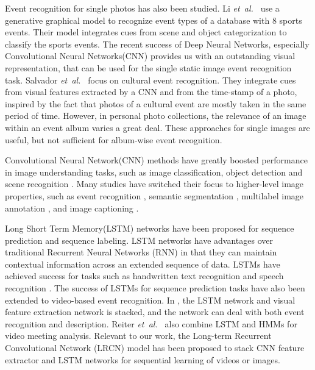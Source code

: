 \documentclass[runningheads]{llncs}
\newcommand{\etal}{\mbox{\emph{et al.\ }}}
\begin{document}
Event recognition for single photos has also been studied.  Li \etal \cite{what_where} use a generative graphical model to recognize event types of a database with 8 sports events. Their model integrates cues from scene and object categorization to classify the sports events. The recent success of Deep Neural Networks, especially  Convolutional Neural Networks(CNN) provides us with an outstanding visual representation, that can be used for the single static image event recognition task\cite{Park_2015_CVPR_Workshops, cSalvadora}. Salvador \etal\cite{cSalvadora} focus on cultural event recognition. They integrate cues from visual features extracted by a CNN and from the time-stamp of a photo, inspired by the fact that photos of a cultural event are mostly taken in the same period of time. However, in personal photo collections, the relevance of an image within an event album varies a great deal. These approaches for single images are useful, but not sufficient for album-wise event recognition.



Convolutional Neural Network(CNN) methods have greatly boosted performance in image understanding tasks, such as image classification, object detection and scene recognition \cite{imagenet, googlenet, rcnn, places}. Many studies have switched their focus to higher-level image properties, such as event recognition \cite{event_recognition}, semantic segmentation \cite{long_shelhamer_fcn},  multilabel image annotation \cite{tagging}, and image captioning \cite{lrcn}. 

Long Short Term Memory(LSTM) networks \cite{lstm} have been proposed for sequence prediction and sequence labeling. LSTM networks have advantages over traditional Recurrent Neural Networks (RNN) in that they can maintain contextual information across  an extended sequence of data. LSTMs have achieved success for tasks such as handwritten text recognition \cite{Graves} and speech recognition \cite{speech}. 
The success of LSTMs for sequence prediction tasks have also been extended to video-based event recognition. In \cite{lstm}, the LSTM network and visual feature extraction network is stacked, and the network can deal with both event recognition and description. Reiter \etal \cite{lstm2} also combine LSTM and HMMs for video meeting analysis. Relevant to our work, the Long-term Recurrent Convolutional Network (LRCN) model \cite{lrcn} has been proposed to stack CNN feature extractor and LSTM networks for sequential learning of videos or images.
\end{document}
